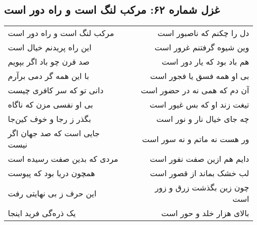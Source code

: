 \begin{center}
\section*{غزل شماره ۶۲: مرکب لنگ است و راه دور است}
\label{sec:062}
\begin{longtable}{l p{0.5cm} r}
مرکب لنگ است و راه دور است
&&
دل را چکنم که ناصبور است
\\
این راه پریدنم خیال است
&&
وین شیوه گرفتنم غرور است
\\
صد قرن چو باد اگر بپویم
&&
هم باد بود که یار دور است
\\
با این همه گر دمی برآرم
&&
بی او همه فسق یا فجور است
\\
دانی تو که سر کافری چیست
&&
آن دم که همی نه در حضور است
\\
بی او نفسی مزن که ناگاه
&&
تیغت زند او که بس غیور است
\\
بگذر ز رجا و خوف کین‌جا
&&
چه جای خیال نار و نور است
\\
جایی است که صد جهان اگر نیست
&&
ور هست نه ماتم و نه سور است
\\
مردی که بدین صفت رسیده است
&&
دایم هم ازین صفت نفور است
\\
همچون دریا بود که پیوست
&&
لب خشک بماند از قصور است
\\
این حرف ز بی نهایتی رفت
&&
چون زین بگذشت زرق و زور است
\\
یک ذره‌گی فرید اینجا
&&
بالای هزار خلد و حور است
\\
\end{longtable}
\end{center}
